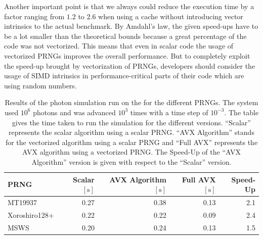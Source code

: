 \documentclass{stdlocal}
\begin{document}
    Another important point is that we always could reduce the execution time by a factor ranging from $1.2$ to $2.6$ when using a cache without introducing vector intrinsics to the actual benchmark.
    By Amdahl's law, the given speed-ups have to be a lot smaller than the theoretical bounds because a great percentage of the code was not vectorized.
    This means that even in scalar code the usage of vectorized PRNGs improves the overall performance.
    But to completely exploit the speed-up brought by vectorization of PRNGs, developers should consider the usage of SIMD intrinsics in performance-critical parts of their code which are using random numbers.

    \newpage

    \begin{table}[H]
      \center
      \caption[Photon Simulation Results]{
        Results of the photon simulation run on the  for the different PRNGs.
        The system used $10^6$ photons and was advanced $10^3$ times with a time step of $10^{-3}$.
        The table gives the time taken to run the simulation for the different versions.
        \enquote{Scalar} represents the scalar algorithm using a scalar PRNG.
        \enquote{AVX Algorithm} stands for the vectorized algorithm using a scalar PRNG and \enquote{Full AVX} represents the AVX algorithm using a vectorized PRNG.
        The Speed-Up of the \enquote{AVX Algorithm} version is given with respect to the \enquote{Scalar} version.
      }
      \label{tab:photon-results}
      \begin{tabular}{lrrrr}
        \hline
        \textbf{PRNG} & \textbf{Scalar $[\mathrm{s}]$} & \textbf{AVX Algorithm $[\mathrm{s}]$} & \textbf{Full AVX $[\mathrm{s}]$} & \textbf{Speed-Up} \\
        \hline
        \hline
        MT19937 & 0.27 & 0.38 & 0.13 & 2.1 \\
        Xoroshiro128+ & 0.22 & 0.22 & 0.09 & 2.4 \\
        MSWS & 0.20 & 0.24 & 0.13 & 1.5 \\
        \hline
      \end{tabular}
    \end{table}
\end{document}
